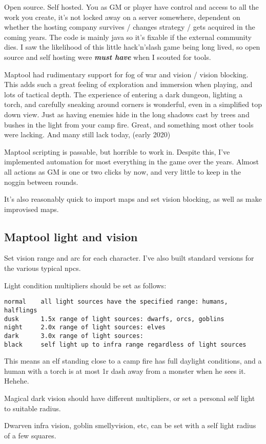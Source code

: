 Open source. Self hosted. You as GM or player have control and access to all the work you create, it's not locked away on a server somewhere, dependent on whether the hosting company survives / changes strategy / gets acquired in the coming years. The code is mainly java so it's fixable if the external community dies. I saw the likelihood of this little hack'n'slash game being long lived, so open source and self hosting were \textit{\textbf{must have}} when I scouted for tools.

Maptool had rudimentary support for fog of war and vision / vision blocking. This adds such a great feeling of exploration and immersion when playing, and lots of tactical depth. The experience of entering a dark dungeon, lighting a torch, and carefully sneaking around corners is wonderful, even in a simplified top down view. Just as having enemies hide in the long shadows cast by trees and bushes in the light from your camp fire. Great, and something most other tools were lacking. And many still lack today, \vvsmall(early 2020)\normalsize

Maptool scripting is passable, but horrible to work in. Despite this, I've implemented automation for most everything in the game over the years. Almost all actions as GM is one or two clicks by now, and very little to keep in the noggin between rounds.

It's also reasonably quick to import maps and set vision blocking, as well as make improvised maps.


\subsection*{Maptool light and vision}
Set vision range and arc for each character. I've also built standard versions for the various typical npcs.

Light condition multipliers should be set as follows:
\small\begin{verbatim}
normal    all light sources have the specified range: humans, halflings
dusk      1.5x range of light sources: dwarfs, orcs, goblins
night     2.0x range of light sources: elves
dark      3.0x range of light sources:
black     self light up to infra range regardless of light sources
\end{verbatim}\normalsize

This means an elf standing close to a camp fire has full daylight conditions, and a human with a torch is at most 1r dash away from a monster when he sees it. Hehehe.

Magical dark vision should have different multipliers, or set a personal self light to suitable radius.

Dwarven infra vision, goblin smellyvision, etc, can be set with a self light radius of a few squares.







